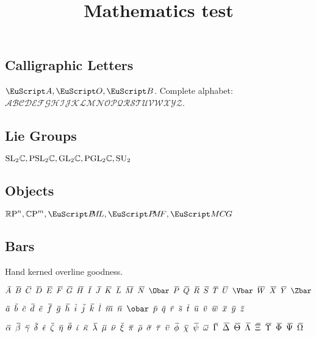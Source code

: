 \documentclass[noaddress, tikz]{nmd-article}
\title{Mathematics test}
\begin{document}
\maketitle

\subsection*{Calligraphic Letters}  $\cA, \cO, \cB$.  Complete
alphabet: \\
$\mathcal{ABCDEFGHIJKLMNOPQRSTUVWXYZ}$.

\subsection*{Lie Groups}  $\mathrm{ SL}_{2} {\mathbb C}, \mathrm{PSL}_{2} {\mathbb C}, \mathrm{GL}_{2} {\mathbb C},
\mathrm{PGL}_{2} {\mathbb C}, \mathrm{SU}_2$

\subsection*{Objects} $\RP^n, \CP^m, \PML, \PMF, \MCG$

\subsection*{Bars} Hand kerned overline goodness.  

$\Abar \enskip \Bbar \enskip \Cbar \enskip \Dbar
\enskip \Ebar \enskip \Fbar \enskip \Gbar \enskip \Hbar \enskip \Ibar
\enskip \Jbar \enskip \Kbar \enskip \Lbar \enskip \Mbar \enskip \Nbar
\enskip \Obar \enskip \Pbar \enskip \Qbar \enskip \Rbar \enskip \Sbar
\enskip \Tbar \enskip \Ubar \enskip \Vbar \enskip \Wbar \enskip \Xbar
\enskip \Ybar \enskip \Zbar$

$\abar \enskip \bbar \enskip \cbar \enskip \dbar \enskip \ebar \enskip
\fbar \enskip \gbar \enskip \hhbar \enskip \ibar \enskip \jbar \enskip \kbar
\enskip \lbar \enskip \mbar \enskip \nbar \enskip \obar \enskip \pbar
\enskip \qbar \enskip \rbar \enskip \sbar \enskip \tbar \enskip \ubar
\enskip \vbar \enskip \wbar \enskip \xbar \enskip \ybar \enskip \zbar$

$\alphabar \enskip \betabar \enskip \gammabar \enskip \deltabar \enskip \epsilonbar \enskip \zetabar \enskip \etabar \enskip \thetabar \enskip \iotabar \enskip \kappabar \enskip \lambdabar \enskip \mubar \enskip \nubar \enskip \xibar \enskip \pibar \enskip \rhobar \enskip \sigmabar \enskip \taubar \enskip \upsilonbar \enskip \phibar \enskip \chibar \enskip \psibar \enskip \omegabar \enskip \Gammabar \enskip \Deltabar \enskip \Thetabar \enskip \Lambdabar \enskip \Xibar \enskip \Upsilonbar \enskip \Phibar \enskip \Psibar \enskip \Omegabar$
\end{document}
